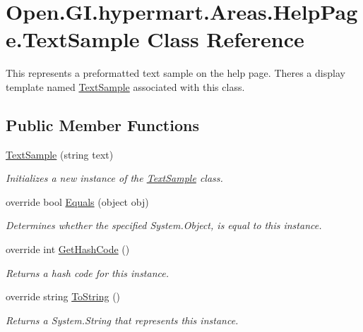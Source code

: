 \hypertarget{class_open_1_1_g_i_1_1hypermart_1_1_areas_1_1_help_page_1_1_text_sample}{}\section{Open.\+G\+I.\+hypermart.\+Areas.\+Help\+Page.\+Text\+Sample Class Reference}
\label{class_open_1_1_g_i_1_1hypermart_1_1_areas_1_1_help_page_1_1_text_sample}


This represents a preformatted text sample on the help page. There\textquotesingle{}s a display template named \hyperlink{class_open_1_1_g_i_1_1hypermart_1_1_areas_1_1_help_page_1_1_text_sample}{Text\+Sample} associated with this class.  


\subsection*{Public Member Functions}
\begin{DoxyCompactItemize}
\item 
\hyperlink{class_open_1_1_g_i_1_1hypermart_1_1_areas_1_1_help_page_1_1_text_sample_aa2097f4582d638f73b4982201ab7e3e3}{Text\+Sample} (string text)
\begin{DoxyCompactList}\small\item\em Initializes a new instance of the \hyperlink{class_open_1_1_g_i_1_1hypermart_1_1_areas_1_1_help_page_1_1_text_sample}{Text\+Sample} class. \end{DoxyCompactList}\item 
override bool \hyperlink{class_open_1_1_g_i_1_1hypermart_1_1_areas_1_1_help_page_1_1_text_sample_a05b2a9d64c25c827a041e83516b4cb18}{Equals} (object obj)
\begin{DoxyCompactList}\small\item\em Determines whether the specified System.\+Object, is equal to this instance. \end{DoxyCompactList}\item 
override int \hyperlink{class_open_1_1_g_i_1_1hypermart_1_1_areas_1_1_help_page_1_1_text_sample_a020567c194ea1dff6b48f033c7dee994}{Get\+Hash\+Code} ()
\begin{DoxyCompactList}\small\item\em Returns a hash code for this instance. \end{DoxyCompactList}\item 
override string \hyperlink{class_open_1_1_g_i_1_1hypermart_1_1_areas_1_1_help_page_1_1_text_sample_a06ee6af965d7778dcb62e1d49af71740}{To\+String} ()
\begin{DoxyCompactList}\small\item\em Returns a System.\+String that represents this instance. \end{DoxyCompactList}\end{DoxyCompactItemize}
